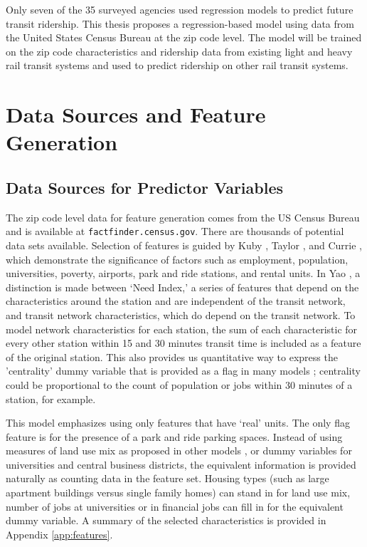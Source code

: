 \documentclass[11pt]{article}
\begin{document}
Only seven of the 35 surveyed agencies used regression models to predict future transit ridership. This thesis proposes a regression-based model using data from the United States Census Bureau at the zip code level. The model will be trained on the zip code characteristics and ridership data from existing light and heavy rail transit systems and used to predict ridership on other rail transit systems.  

\section{Data Sources and Feature Generation}

\subsection{Data Sources for Predictor Variables}

The zip code level data for feature generation comes from the US Census Bureau and is available at \texttt{factfinder.census.gov}. There are thousands of potential data sets available. Selection of features is guided by Kuby \cite{Kuby2004}, Taylor \cite{Taylor2008}, and Currie \cite{Currie2011}, which demonstrate the significance of factors such as employment, population, universities, poverty, airports, park and ride stations, and rental units. In Yao \cite{Yao2007}, a distinction is made between `Need Index,' a series of features that depend on the characteristics around the station and are independent of the transit network, and transit network characteristics, which do depend on the transit network. To model network characteristics for each station, the sum of each characteristic for every other station within 15 and 30 minutes transit time is included as a feature of the original station. This also provides us quantitative way to express the 'centrality' dummy variable that is provided as a flag in many models \cite{Kuby2004, Durning2015}; centrality could be proportional to the count of population or jobs within 30 minutes of a station, for example.

This model emphasizes using only features that have `real' units. The only flag feature is for the presence of a park and ride parking spaces. Instead of using measures of land use mix as proposed in other models \cite{Durning2015, Gutierrez2011}, or dummy variables for universities and central business districts, the equivalent information is provided naturally as counting data in the feature set. Housing types (such as large apartment buildings versus single family homes) can stand in for land use mix, number of jobs at universities or in financial jobs can fill in for the equivalent dummy variable. A summary of the selected characteristics is provided in Appendix \ref{app:features}.
\end{document}

